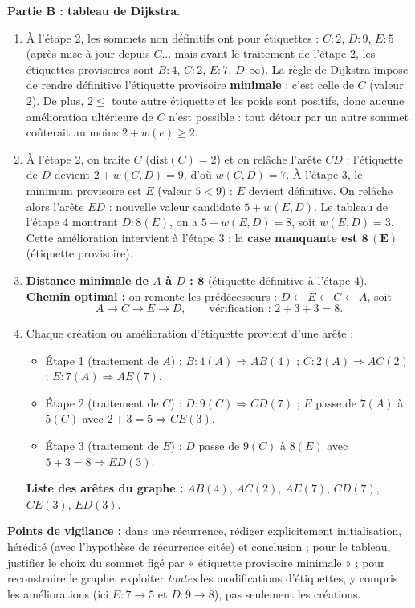 \documentclass[11pt]{article}
\begin{document}
\begin{corrige}
\textbf{Partie B : tableau de Dijkstra.}
\begin{enumerate}
\item À l'étape 2, les sommets non définitifs ont pour étiquettes : $C : 2$, $D : 9$, $E : 5$ (après mise à jour depuis $C$... mais avant le traitement de l'étape 2, les étiquettes provisoires sont $B : 4$, $C : 2$, $E : 7$, $D : \infty$). La règle de Dijkstra impose de rendre définitive l'étiquette provisoire \textbf{minimale} : c'est celle de $C$ (valeur $2$). De plus, $2 \leq$ toute autre étiquette et les poids sont positifs, donc aucune amélioration ultérieure de $C$ n'est possible : tout détour par un autre sommet coûterait au moins $2 + w(e) \geq 2$.
\item À l'étape 2, on traite $C$ ($\text{dist}(C) = 2$) et on relâche l'arête $CD$ : l'étiquette de $D$ devient $2 + w(C,D) = 9$, d'où $w(C,D) = 7$. À l'étape 3, le minimum provisoire est $E$ (valeur $5 < 9$) : $E$ devient définitive. On relâche alors l'arête $ED$ : nouvelle valeur candidate $5 + w(E,D)$. Le tableau de l'étape 4 montrant $D : 8(E)$, on a $5 + w(E,D) = 8$, soit $w(E,D) = 3$. Cette amélioration intervient à l'étape 3 : la \textbf{case manquante est $\mathbf{8\,(E)}$} (étiquette provisoire).
\item \textbf{Distance minimale de $A$ à $D$ : $\mathbf{8}$} (étiquette définitive à l'étape 4). \textbf{Chemin optimal :} on remonte les prédécesseurs : $D \leftarrow E \leftarrow C \leftarrow A$, soit
\[ A \to C \to E \to D, \qquad \text{vérification : } 2 + 3 + 3 = 8. \]
\item Chaque création ou amélioration d'étiquette provient d'une arête :
\begin{itemize}
    \item Étape 1 (traitement de $A$) : $B : 4(A) \Rightarrow AB(4)$ ; $C : 2(A) \Rightarrow AC(2)$ ; $E : 7(A) \Rightarrow AE(7)$.
    \item Étape 2 (traitement de $C$) : $D : 9(C) \Rightarrow CD(7)$ ; $E$ passe de $7(A)$ à $5(C)$ avec $2 + 3 = 5 \Rightarrow CE(3)$.
    \item Étape 3 (traitement de $E$) : $D$ passe de $9(C)$ à $8(E)$ avec $5 + 3 = 8 \Rightarrow ED(3)$.
\end{itemize}
\textbf{Liste des arêtes du graphe :} $AB(4)$, $AC(2)$, $AE(7)$, $CD(7)$, $CE(3)$, $ED(3)$.
\end{enumerate}
\textbf{Points de vigilance :} dans une récurrence, rédiger explicitement initialisation, hérédité (avec l'hypothèse de récurrence citée) et conclusion ; pour le tableau, justifier le choix du sommet figé par « étiquette provisoire minimale » ; pour reconstruire le graphe, exploiter \emph{toutes} les modifications d'étiquettes, y compris les améliorations (ici $E : 7 \to 5$ et $D : 9 \to 8$), pas seulement les créations.
\end{corrige}
\end{document}
